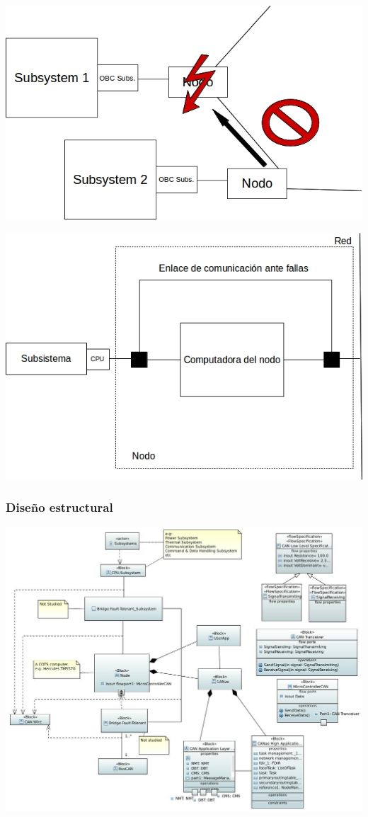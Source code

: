 \begin{frame}[c]
	\centering
	\includegraphics[scale=0.4]{images/Bridge2.jpg}
\end{frame}

\begin{frame}[c]
	\centering
	\includegraphics[scale=0.4]{images/com_nodo.jpg}
\end{frame}

\begin{frame}[c]
	\frametitle{Diseño estructural}
	\centering
	\includegraphics[scale=0.25]{images/ArqCompletaBlockDiagram.JPG}
\end{frame}


